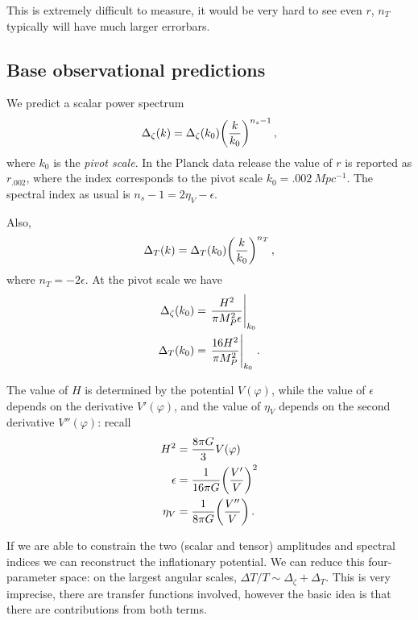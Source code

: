\documentclass[main.tex]{subfiles}
\begin{document}
This is extremely difficult to measure, it would be very hard to see even \(r\), \(n_T\) typically will have much larger errorbars. 


\subsection{Base observational predictions}

We predict a scalar power spectrum 
%
\begin{align}
\Delta_{\zeta } (k) = \Delta_\zeta (k_0 ) \qty( \frac{k}{k_0 })^{n_s-1}
\,,
\end{align}
%
where \(k_0 \) is the \emph{pivot scale}. 
In the Planck data release \cite[]{planckcollaborationPlanck2018Results2019} the value of \(r\) is reported as \(r_{\num{.002}}\), where the index corresponds to the pivot scale \(k_0  = \SI{.002}{Mpc^{-1}}\).
The spectral index as usual is \(n_s - 1 = 2 \eta _V - \epsilon \). 

Also, 
%
\begin{align}
\Delta _T (k) = \Delta _T (k_0 ) \qty(\frac{k}{k_0 })^{n_T}
\,,
\end{align}
%
where \(n_T = - 2 \epsilon \). 
At the pivot scale we have 
%
\begin{align}
\Delta _\zeta (k_0 ) &= \eval{\frac{H^2}{\pi M_P^2 \epsilon }}_{k_0 }  \\
\Delta _T (k_0 ) &= \eval{\frac{16 H^2}{\pi M_P^2} }_{k_0 }
\,.
\end{align}

The value of \(H\) is determined by the potential \(V(\varphi )\), while the value of \(\epsilon \) depends on the derivative \(V' (\varphi )\), and the value of \(\eta _V\) depends on the second derivative \(V''(\varphi )\): recall 
%
\begin{align}
H^2 &= \frac{8 \pi G}{3} V(\varphi )  \\
\epsilon &= \frac{1}{16 \pi G} \qty(\frac{V'}{V})^2  \\
\eta _V &= \frac{1}{8 \pi G} \qty(\frac{V''}{V})
\,.
\end{align}
%

If we are able to constrain the two (scalar and tensor) amplitudes and spectral indices we can reconstruct the inflationary potential.  
We can reduce this four-parameter space: on the largest angular scales, \(\Delta T / T \sim \Delta _\zeta + \Delta _T\). This is very imprecise, there are transfer functions involved, however the basic idea is that there are contributions from both terms. 
\end{document}
